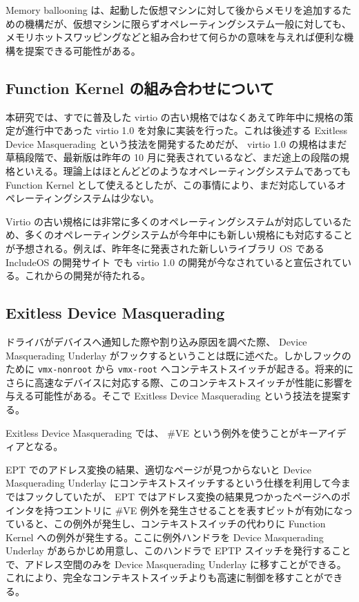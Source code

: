 \documentclass[a4paper,11pt,report]{ltjsbook}
\begin{document}
Memory ballooning は、起動した仮想マシンに対して後からメモリを追加するための機構だが、仮想マシンに限らずオペレーティングシステム一般に対しても、メモリホットスワッピングなどと組み合わせて何らかの意味を与えれば便利な機構を提案できる可能性がある。

\subsection{Function Kernel の組み合わせについて}

本研究では、すでに普及した virtio の古い規格ではなくあえて昨年中に規格の策定が進行中であった virtio 1.0 を対象に実装を行った。これは後述する Exitless Device Masquerading という技法を開発するためだが、 virtio 1.0 の規格はまだ草稿段階で、最新版は昨年の 10 月に発表されているなど、まだ途上の段階の規格といえる。理論上はほとんどどのようなオペレーティングシステムであっても Function Kernel として使えるとしたが、この事情により、まだ対応しているオペレーティングシステムは少ない。

Virtio の古い規格には非常に多くのオペレーティングシステムが対応しているため、多くのオペレーティングシステムが今年中にも新しい規格にも対応することが予想される。例えば、昨年冬に発表された新しいライブラリ OS である IncludeOS\cite{includeos} の開発サイト\cite{incosdev} でも virtio 1.0 の開発が今なされていると宣伝されている。これからの開発が待たれる。

\subsection{Exitless Device Masquerading}

ドライバがデバイスへ通知した際や割り込み原因を調べた際、 Device Masquerading Underlay がフックするということは既に述べた。しかしフックのために \texttt{vmx-nonroot} から \texttt{vmx-root} へコンテキストスイッチが起きる。将来的にさらに高速なデバイスに対応する際、このコンテキストスイッチが性能に影響を与える可能性がある。そこで Exitless Device Masquerading という技法を提案する。

Exitless Device Masquerading では、 \#VE という例外を使うことがキーアイディアとなる。

EPT でのアドレス変換の結果、適切なページが見つからないと Device Masquerading Underlay にコンテキストスイッチするという仕様を利用して今まではフックしていたが、 EPT ではアドレス変換の結果見つかったページへのポインタを持つエントリに \#VE 例外を発生させることを表すビットが有効になっていると、この例外が発生し、コンテキストスイッチの代わりに Function Kernel への例外が発生する。ここに例外ハンドラを Device Masquerading Underlay があらかじめ用意し、このハンドラで EPTP スイッチを発行することで、アドレス空間のみを Device Masquerading Underlay に移すことができる。これにより、完全なコンテキストスイッチよりも高速に制御を移すことができる。
\end{document}
